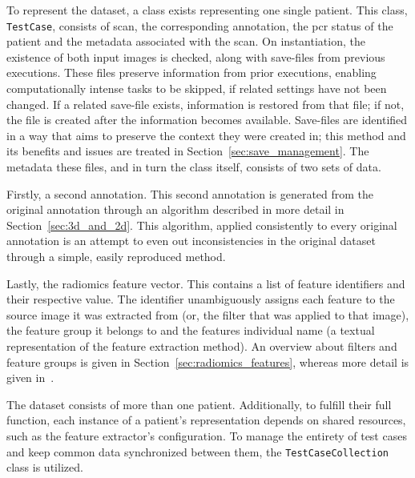 To represent the dataset, a class exists representing one single patient. This 
class, \texttt{TestCase}, consists of  scan, the corresponding 
annotation, the \ac{pcr} status of the patient and the metadata associated with 
the scan. On instantiation, the existence of both 
input images is checked, along with save-files from previous executions. These
files preserve information from prior executions, enabling computationally 
intense tasks to be skipped, if related settings have not been changed. If a 
related save-file exists, information is restored from that file; if not, the 
file is created after the information becomes available. Save-files are 
identified in a way that aims to preserve the context they were created in; this 
method and its benefits and issues are treated in Section~\ref{sec:save_management}.
The metadata these files, and in turn the class itself, consists of two sets of data.

Firstly, a second annotation. This second annotation is generated from the 
original annotation through an algorithm described in more detail in 
Section~\ref{sec:3d_and_2d}. This algorithm, applied consistently to every 
original annotation is an attempt to even out inconsistencies in the original 
dataset through a simple, easily reproduced method.

Lastly, the radiomics feature vector. This contains a list of feature 
identifiers and their respective value. The identifier unambiguously assigns 
each feature to the source image it was extracted from (or, the filter that was 
applied to that image), the feature group it belongs to and the features 
individual name (a textual representation of the feature extraction method). An overview about filters and feature groups is given in 
Section~\ref{sec:radiomics_features}, whereas more detail is given in~\cite{py_rad_docs}.

%

The dataset consists of more than one patient. Additionally, to fulfill their 
full function, each instance of a patient's representation depends on shared 
resources, such as the feature extractor's configuration. To manage the entirety
of test cases and keep common data synchronized between them, the 
\texttt{TestCaseCollection} class is utilized. 


